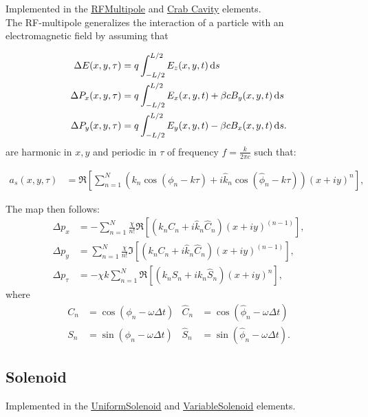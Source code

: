 Implemented in the \href{https://xsuite.readthedocs.io/en/latest/apireference.html#rfmultipole}{\underline{RFMultipole}}
and \href{https://xsuite.readthedocs.io/en/latest/apireference.html#crabcavity}{\underline{Crab Cavity}} elements.
~\\

The RF-multipole generalizes the interaction of a particle with an electromagnetic field by assuming that

\begin{align}
\Delta E(x,y,\tau) &= q \int_{-L/2}^{L/2} E_z(x,y,t)  {\rm \,d}s \\
\Delta P_x(x,y,\tau) &= q \int_{-L/2}^{L/2} E_x(x,y,t) + \beta c B_y(x,y,t) {\rm \,d}s\\
\Delta P_y(x,y,\tau) &= q \int_{-L/2}^{L/2} E_y(x,y,t) - \beta c B_x(x,y,t) {\rm \,d}s.
\end{align}
are harmonic in $x,y$ and periodic in $\tau$ of frequency $f=\frac{k}{2\pi c}$ such that:

\begin{align}
a_s(x,y,\tau)
&= \Re \left[ \sum_{n=1}^N
      \left(       k_n \cos(\phi_n -k \tau ) +
            i \hat k_n \cos(\hat \phi_n -k \tau)
      \right)
      (x+i y )^n
     \right],
\end{align}

The map then follows:
\begin{align}
    \Delta p_x &= -\sum_{n=1}^N \frac{\chi}{n!} \Re\left[ (k_n C_n + i \hat k_n \hat C_n)(x+iy)^{(n-1)}\right], \\
    \Delta p_y &=  \sum_{n=1}^N \frac{\chi}{n!} \Im\left[ (k_n C_n + i \hat k_n \hat C_n)(x+iy)^{(n-1)}\right], \\
    \Delta p_\tau &= -\chi k \sum_{n=1}^N \Re\left[( k_n S_n + i k_n \hat S_n ) (x+iy)^n\right],
\end{align}
where
\begin{align}
     C_n&=\cos(\phi_n-\omega \Delta t) &
\hat C_n&=\cos(\hat \phi_n-\omega \Delta t) \\
     S_n&=\sin(\phi_n-\omega \Delta t) &
\hat S_n&=\sin(\hat \phi_n-\omega \Delta t) .
\end{align}


\subsection{Solenoid}

Implemented in the \href{https://xsuite.readthedocs.io/en/latest/apireference.html#uniformsolenoid}{\underline{UniformSolenoid}}
and \href{https://xsuite.readthedocs.io/en/latest/apireference.html#variablesolenoid}{\underline{VariableSolenoid}} elements.
~\\

